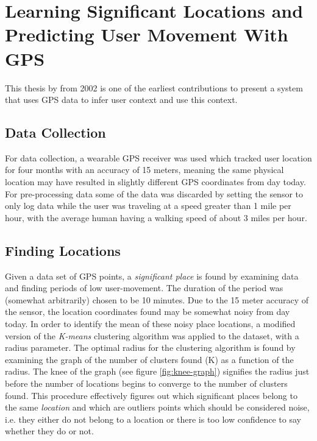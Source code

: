 \section{Learning Significant Locations and Predicting User Movement With GPS}
This thesis by \cite{learning_significant_locations} from 2002 is one of the earliest contributions to present a system that uses GPS data to infer user context and use this context. 

\subsection{Data Collection}
For data collection, a wearable GPS receiver was used which tracked user location for four months with an accuracy of 15 meters, meaning the same physical location may have resulted in slightly different GPS coordinates from day today. For pre-processing data some of the data was discarded by setting the sensor to only log data while the user was traveling at a speed greater than 1 mile per hour, with the average human having a walking speed of about 3 miles per hour. 

\subsection{Finding Locations}
Given a data set of GPS points, a \textit{significant place} is found by examining data and finding periods of low user-movement. The duration of the period was (somewhat arbitrarily) chosen to be 10 minutes. Due to the 15 meter accuracy of the sensor, the location coordinates found may be somewhat noisy from day today. In order to identify the mean of these noisy place locations, a modified version of the \textit{K-means} clustering algorithm was applied to the dataset, with a radius parameter. The optimal radius for the clustering algorithm is found by examining the graph of the number of clusters found (K) as a function of the radius. The knee of the graph (see figure \ref{fig:knee-graph}) signifies the radius just before the number of locations begins to converge to the number of clusters found. This procedure effectively figures out which significant places belong to the same \textit{location} and which are outliers points which should be considered noise, i.e. they either do not belong to a location or there is too low confidence to say whether they do or not. 

